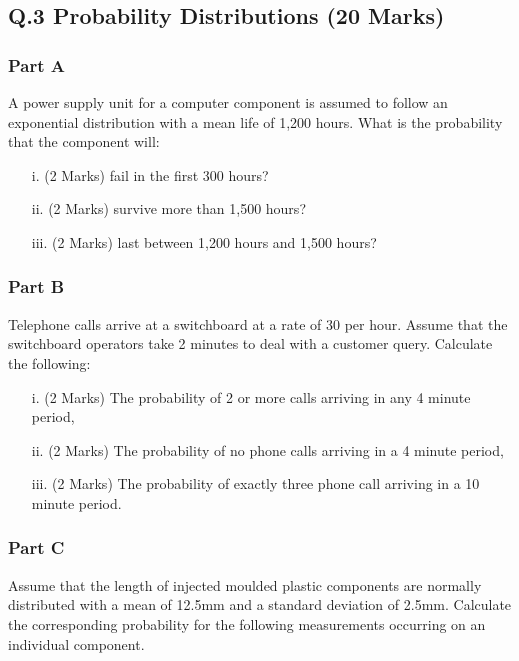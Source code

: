 \documentclass[a4paper,12pt]{article}
\begin{document}
\newpage


\subsection*{Q.3 Probability Distributions (20 Marks)}

\subsubsection*{Part A} %
A power supply unit for a computer component is assumed to follow an exponential distribution with a mean life of 1,200 hours.  What is the probability that the component will:
\begin{itemize}
\item [i.](2 Marks)	fail in the first 300 hours?
\item [ii.](2 Marks)	survive more than 1,500 hours?
\item [iii.](2 Marks) last between 1,200 hours and 1,500 hours?
\end{itemize}

\subsubsection*{Part B}%
Telephone calls arrive at a switchboard at a rate of 30 per hour.  Assume that the switchboard operators take 2 minutes to deal with a customer query. Calculate the following:

\begin{itemize}
\item [i.](2 Marks)	The probability of 2 or more calls arriving in any 4 minute period,
\item [ii.](2 Marks) The probability of no phone calls arriving in a 4 minute period,
\item [iii.](2 Marks) The probability of exactly three phone call arriving in a 10 minute period.

\end{itemize}
\subsubsection*{Part C} %
Assume that the length of injected moulded plastic components are normally distributed with a mean of 12.5mm and a standard deviation of 2.5mm.  Calculate the corresponding probability for the following measurements occurring on an individual component.
\end{document}
